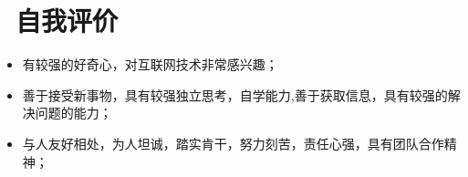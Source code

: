 \documentclass{resume}
\begin{document}
\section{\faInfo\ 自我评价}
\begin{itemize}[parsep=0.5ex]
  \item 有较强的好奇心，对互联网技术非常感兴趣；
  \item 善于接受新事物，具有较强独立思考，自学能力,善于获取信息，具有较强的解决问题的能力；
  \item 与人友好相处，为人坦诚，踏实肯干，努力刻苦，责任心强，具有团队合作精神；
\end{itemize}

%
%
\end{document}
